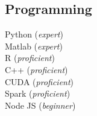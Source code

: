 \documentclass[letterpaper]{deedy-resume} %
\begin{document}
\begin{minipage}[t]{0.33\textwidth}
\subsection{Programming}


Python ({\it expert}) \\  Matlab ({\it expert}) \\R ({\it proficient})\\   C++ ({\it proficient}) \\  CUDA ({\it proficient}) \\ Spark ({\it proficient}) \\ Node JS ({\it beginner})
\sectionspace %


\end{minipage} %
\hfill
%
%
\end{document}
